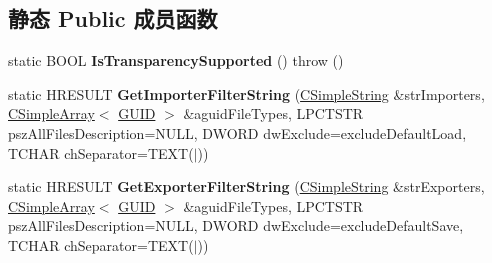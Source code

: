 \subsection*{静态 Public 成员函数}
\begin{DoxyCompactItemize}
\item 
\mbox{\label{class_a_t_l_1_1_c_image_af9fe2676fe34c24ba353a9a2db09e7b5}} 
static B\+O\+OL {\bfseries Is\+Transparency\+Supported} ()  throw ()
\item 
\mbox{\label{class_a_t_l_1_1_c_image_a44bc5e512242278854653752427a7813}} 
static H\+R\+E\+S\+U\+LT {\bfseries Get\+Importer\+Filter\+String} (\hyperlink{class_a_t_l_1_1_c_simple_string_t}{C\+Simple\+String} \&str\+Importers, \hyperlink{class_a_t_l_1_1_c_simple_array}{C\+Simple\+Array}$<$ \hyperlink{interface_g_u_i_d}{G\+U\+ID} $>$ \&aguid\+File\+Types, L\+P\+C\+T\+S\+TR psz\+All\+Files\+Description=N\+U\+LL, D\+W\+O\+RD dw\+Exclude=exclude\+Default\+Load, T\+C\+H\+AR ch\+Separator=T\+E\+XT(\textquotesingle{}$\vert$\textquotesingle{}))
\item 
\mbox{\label{class_a_t_l_1_1_c_image_abac2beefa1d04edb5f190827b1b35e8a}} 
static H\+R\+E\+S\+U\+LT {\bfseries Get\+Exporter\+Filter\+String} (\hyperlink{class_a_t_l_1_1_c_simple_string_t}{C\+Simple\+String} \&str\+Exporters, \hyperlink{class_a_t_l_1_1_c_simple_array}{C\+Simple\+Array}$<$ \hyperlink{interface_g_u_i_d}{G\+U\+ID} $>$ \&aguid\+File\+Types, L\+P\+C\+T\+S\+TR psz\+All\+Files\+Description=N\+U\+LL, D\+W\+O\+RD dw\+Exclude=exclude\+Default\+Save, T\+C\+H\+AR ch\+Separator=T\+E\+XT(\textquotesingle{}$\vert$\textquotesingle{}))
\end{DoxyCompactItemize}
